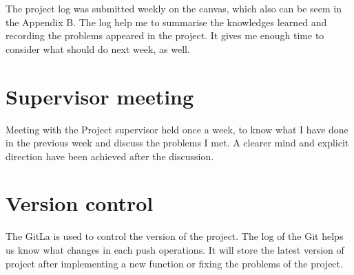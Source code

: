 The project log was submitted weekly on the canvas, which also can be seem in the Appendix B. The log help me to summarise the knowledges learned and recording the problems appeared in the project.  It gives me enough time to consider what should do next week, as well.

\section{Supervisor meeting}

Meeting with the Project supervisor held once a week, to know what I have done in the previous week and discuss the problems I met. A clearer mind and explicit direction have been achieved after the discussion.

\section{Version control}
The GitLa is used to control the version of the project. The log of the Git helps us know what changes in each push operations. It will store the latest version of project after implementing a new function or fixing the problems of the project.